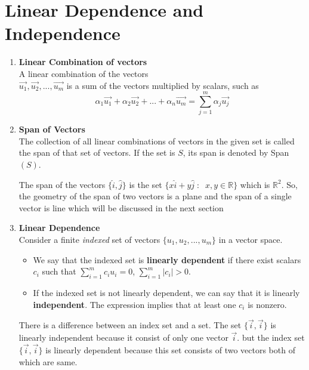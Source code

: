 \documentclass[aima104_lecturenotes_ku.tex]{subfiles}
\begin{document}
\section{Linear Dependence and Independence}
\begin{enumerate}
\item \textbf{Linear Combination of vectors} \\[1mm]
A linear combination of the vectors \\ $\vec{u_1}, \vec{u_2}, ... , \vec{u_m}$
is a sum of the vectors multiplied by scalars, such as $${\alpha}_1\vec{u_1} + \alpha_2\vec{u_2}+...+\alpha_n\vec{u_m}= \sum_{j=1}^m \alpha_j \vec{u_j}$$

\item \textbf{Span of Vectors} \\[1mm]
  The collection of all linear combinations of vectors in the given set is called the span of that set of vectors. If the set is $S$, its span is denoted by Span$(S)$.
  \begin{remark}
    The span of the vectors $\{\hat{i}, \hat{j}\}$ is the set $\{x\hat{i}+y\hat{j}\; : \;\; x,y \in \mathbb{R}\}$ which is $\mathbb{R}^2$. So, the geometry of the span of two vectors is a plane and the span of a single vector is line which will be discussed in the next section
  \end{remark}


  \item \textbf{Linear Dependence} \\[1mm]
Consider a finite \textit{indexed} set of vectors $\{u_1,u_2,...,u_m\}$ in a vector space.
\begin{itemize}
    \item We say that the indexed set is \textbf{linearly dependent} if there exist scalars $c_i$ such that $\displaystyle \sum_{i=1}^m c_iu_i = 0$, \;\;\; $\displaystyle \sum_{i=1}^m |c_i| > 0$.

    \item If the indexed set is not linearly dependent, we can say that it is linearly \textbf{independent}. The expression implies that at least one $c_i$ is nonzero.
\end{itemize}
There is a difference between an index set and a set. The set $\{\vec{i}, \vec{i}\}$ is linearly independent because it consist of only one vector $\vec{i}$. but the index set  $\{\vec{i}, \vec{i}\}$ is linearly dependent because this set consists of two vectors both of which are same.
\end{enumerate}
\end{document}
